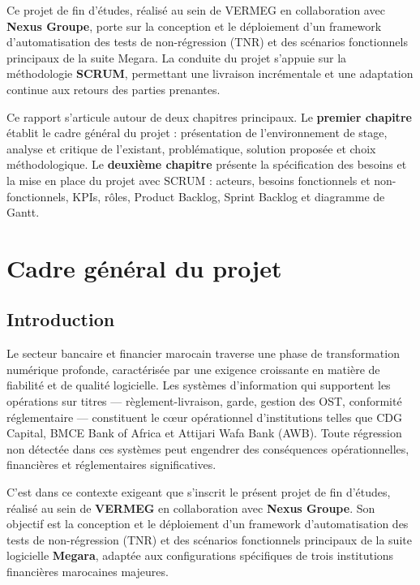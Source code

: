 \documentclass[12pt, a4paper]{report}
\begin{document}
Ce projet de fin d'études, réalisé au sein de VERMEG en collaboration avec \textbf{Nexus Groupe}, porte sur la conception et le déploiement d'un framework d'automatisation des tests de non-régression (TNR) et des scénarios fonctionnels principaux de la suite Megara. La conduite du projet s'appuie sur la méthodologie \textbf{SCRUM}, permettant une livraison incrémentale et une adaptation continue aux retours des parties prenantes.

Ce rapport s'articule autour de deux chapitres principaux. Le \textbf{premier chapitre} établit le cadre général du projet : présentation de l'environnement de stage, analyse et critique de l'existant, problématique, solution proposée et choix méthodologique. Le \textbf{deuxième chapitre} présente la spécification des besoins et la mise en place du projet avec SCRUM : acteurs, besoins fonctionnels et non-fonctionnels, KPIs, rôles, Product Backlog, Sprint Backlog et diagramme de Gantt.

\newpage

\chapter{Cadre général du projet}

\section*{Introduction}

Le secteur bancaire et financier marocain traverse une phase de transformation numérique profonde, caractérisée par une exigence croissante en matière de fiabilité et de qualité logicielle. Les systèmes d'information qui supportent les opérations sur titres — règlement-livraison, garde, gestion des OST, conformité réglementaire — constituent le c\oe{}ur opérationnel d'institutions telles que CDG Capital, BMCE Bank of Africa et Attijari Wafa Bank (AWB). Toute régression non détectée dans ces systèmes peut engendrer des conséquences opérationnelles, financières et réglementaires significatives.

C'est dans ce contexte exigeant que s'inscrit le présent projet de fin d'études, réalisé au sein de \textbf{VERMEG} en collaboration avec \textbf{Nexus Groupe}. Son objectif est la conception et le déploiement d'un framework d'automatisation des tests de non-régression (TNR) et des scénarios fonctionnels principaux de la suite logicielle \textbf{Megara}, adaptée aux configurations spécifiques de trois institutions financières marocaines majeures.
\end{document}
